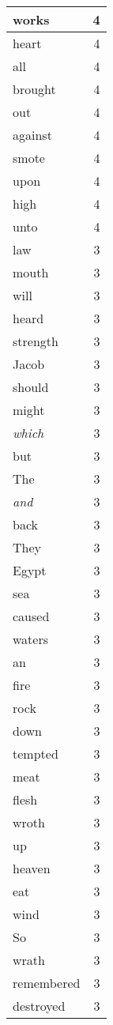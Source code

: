 \begin{center}
\begin{longtable}{l|r}
works & 4\\ \hline 
heart & 4\\ \hline 
all & 4\\ \hline 
brought & 4\\ \hline 
out & 4\\ \hline 
against & 4\\ \hline 
smote & 4\\ \hline 
upon & 4\\ \hline 
high & 4\\ \hline 
unto & 4\\ \hline 
law & 3\\ \hline 
mouth & 3\\ \hline 
will & 3\\ \hline 
heard & 3\\ \hline 
strength & 3\\ \hline 
Jacob & 3\\ \hline 
should & 3\\ \hline 
might & 3\\ \hline 
\emph{which} & 3\\ \hline 
but & 3\\ \hline 
The & 3\\ \hline 
\emph{and} & 3\\ \hline 
back & 3\\ \hline 
They & 3\\ \hline 
Egypt & 3\\ \hline 
sea & 3\\ \hline 
caused & 3\\ \hline 
waters & 3\\ \hline 
an & 3\\ \hline 
fire & 3\\ \hline 
rock & 3\\ \hline 
down & 3\\ \hline 
tempted & 3\\ \hline 
meat & 3\\ \hline 
flesh & 3\\ \hline 
wroth & 3\\ \hline 
up & 3\\ \hline 
heaven & 3\\ \hline 
eat & 3\\ \hline 
wind & 3\\ \hline 
So & 3\\ \hline 
wrath & 3\\ \hline 
remembered & 3\\ \hline 
destroyed & 3\\ \hline 

\end{longtable}
\end{center}

